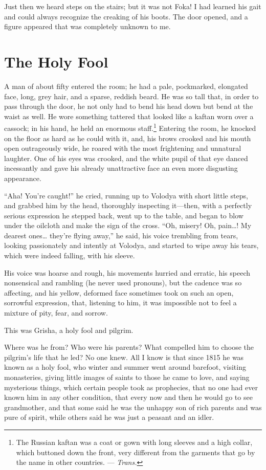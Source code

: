Just then we heard steps on the stairs; but it was not Foka! I had learned his gait and could always recognize the creaking of his boots. The door opened, and a figure appeared that was completely unknown to me.

\chapter{The Holy Fool} %

A man of about fifty entered the room; he had a pale, pockmarked, elongated face, long, grey hair, and a sparse, reddish beard. He was so tall that, in order to pass through the door, he not only had to bend his head down but bend at the waist as well. He wore something tattered that looked like a kaftan worn over a cassock; in his hand, he held an enormous staff.\footnote{The Russian kaftan was a coat or gown with long sleeves and a high collar, which buttoned down the front, very different from the garments that go by the name in other countries. --- \textit{Trans.}} Entering the room, he knocked on the floor as hard as he could with it, and, his brows crooked and his mouth open outrageously wide, he roared with the most frightening and unnatural laughter. One of his eyes was crooked, and the white pupil of that eye danced incessantly and gave his already unattractive face an even more disgusting  appearance.

``Aha! You're caught!'' he cried, running up to Volodya with short little steps, and grabbed him by the head, thoroughly inspecting it---then, with a perfectly serious expression he stepped back, went up to the table, and began to blow under the oilcloth and make the sign of the cross. ``Oh, misery! Oh, pain\ldots{}! My dearest ones\ldots{} they're flying away,'' he said, his voice trembling from tears, looking passionately and intently at Volodya, and started to wipe away his tears, which were indeed falling, with his sleeve. %

His voice was hoarse and rough, his movements hurried and erratic, his speech nonsensical and rambling (he never used pronouns), but the cadence was so affecting, and his yellow, deformed face sometimes took on such an open, sorrowful expression, that, listening to him, it was impossible not to feel a mixture of pity, fear, and sorrow.

This was Grisha, a holy fool and pilgrim.

Where was he from? Who were his parents? What compelled him to choose the pilgrim's life that he led? No one knew. All I know is that since 1815  he was known as a holy fool, who winter and summer went around barefoot, visiting monasteries, giving little images of saints  to those he came to love, and saying mysterious things, which certain people took as prophecies, that no one had ever known him in any other condition, that every now and then he would go to see grandmother, and that some said he was the unhappy son of rich parents and was pure of spirit, while others said he was just a peasant and an idler.

